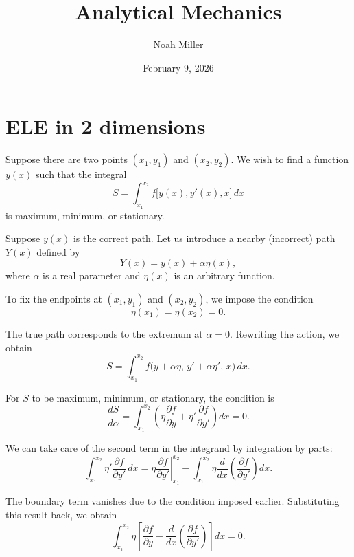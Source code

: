 \documentclass[12pt]{article}
\title{Analytical Mechanics}
\author{Noah Miller}
\date{February 9, 2026}
\begin{document}
\maketitle
\section{ELE in 2 dimensions}
Suppose there are two points $(x_1, y_1)$ and $(x_2, y_2)$. We wish to find
a function $y(x)$ such that the integral
\begin{equation}
S = \int_{x_1}^{x_2} f\big[y(x), y'(x), x\big]\, dx
\end{equation}
is maximum, minimum, or stationary.

Suppose $y(x)$ is the correct path. Let us introduce a nearby (incorrect)
path $Y(x)$ defined by
\begin{equation}
Y(x) = y(x) + \alpha \eta(x),
\end{equation}
where $\alpha$ is a real parameter and $\eta(x)$ is an arbitrary function.

To fix the endpoints at $(x_1, y_1)$ and $(x_2, y_2)$, we impose the condition
\begin{equation}
\eta(x_1) = \eta(x_2) = 0.
\end{equation}

The true path corresponds to the extremum at $\alpha = 0$. Rewriting the
action, we obtain
\begin{equation}
S = \int_{x_1}^{x_2} f\big(y + \alpha \eta,\, y' + \alpha \eta',\, x\big)\, dx.
\end{equation}

For $S$ to be maximum, minimum, or stationary, the condition is
\begin{equation}
\frac{dS}{d\alpha}
= \int_{x_1}^{x_2}
\left(
\eta \frac{\partial f}{\partial y}
+ \eta' \frac{\partial f}{\partial y'}
\right) dx
= 0.
\end{equation}

We can take care of the second term in the integrand by integration by parts:
\begin{equation}
\int_{x_1}^{x_2}
\eta' \frac{\partial f}{\partial y'}\, dx
=
\left.
\eta \frac{\partial f}{\partial y'}
\right|_{x_1}^{x_2}
-
\int_{x_1}^{x_2}
\eta \frac{d}{dx}
\left(
\frac{\partial f}{\partial y'}
\right) dx.
\end{equation}

The boundary term vanishes due to the condition imposed earlier. Substituting
this result back, we obtain
\begin{equation}
\int_{x_1}^{x_2}
\eta
\left[
\frac{\partial f}{\partial y}
-
\frac{d}{dx}
\left(
\frac{\partial f}{\partial y'}
\right)
\right] dx
= 0.
\end{equation}
\end{document}
